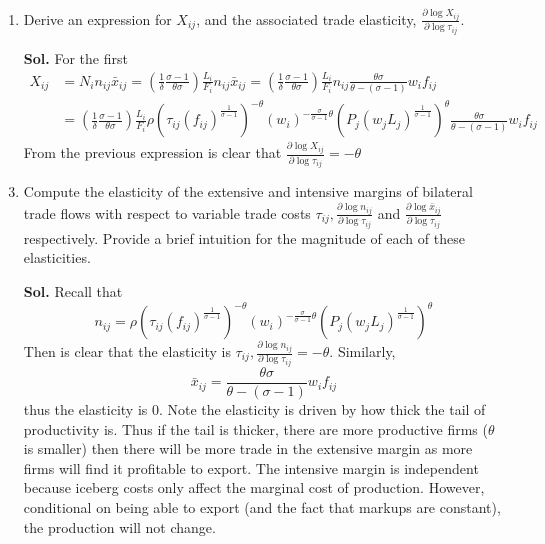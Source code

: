 \documentclass[12pt,oneside,reqno]{amsart}
\begin{document}
\begin{enumerate}[label=\textbf{\roman*.}]
\begin{enumerate}[label=\textbf{(\alph*)}]
    \item  Derive an expression for $X_{i j}$, and the associated trade elasticity, $\frac{\partial \log X_{i j}}{\partial \log \tau_{i j}}$.
    \item[\textbf{Sol.}] For the first 
    \begin{align*}
        X_{ij} &= N_{i} n_{i j} \bar{x}_{i j}  
        = \left(\frac{1}{\delta} \frac{\sigma-1}{\theta \sigma}\right) \frac{L_{i}}{F_{i}} n_{i j} \bar{x}_{i j}
        = \left(\frac{1}{\delta} \frac{\sigma-1}{\theta \sigma}\right) \frac{L_{i}}{F_{i}} n_{i j} \frac{\theta \sigma}{\theta-(\sigma-1)} w_{i} f_{i j} \\ 
        &= \left(\frac{1}{\delta} \frac{\sigma-1}{\theta \sigma}\right) \frac{L_{i}}{F_{i}} \rho\left(\tau_{i j}\left(f_{i j}\right)^{\frac{1}{\sigma-1}}\right)^{-\theta}\left(w_{i}\right)^{-\frac{\sigma}{\sigma-1} \theta}\left(P_{j}\left(w_{j} L_{j}\right)^{\frac{1}{\sigma-1}}\right)^{\theta} \frac{\theta \sigma}{\theta-(\sigma-1)} w_{i} f_{i j}  
    \end{align*}
    From the previous expression is clear that $\frac{\partial \log X_{i j}}{\partial \log \tau_{i j}} = -\theta$
    \item Compute the elasticity of the extensive and intensive margins of bilateral trade flows with respect to variable trade costs $\tau_{i j}, \frac{\partial \log n_{i j}}{\partial \log \tau_{i j}}$ and $\frac{\partial \log \bar{x}_{i j}}{\partial \log \tau_{i j}}$ respectively. Provide a brief intuition for the magnitude of each of these elasticities.
    \item[\textbf{Sol.}] Recall that 
    \begin{equation*}
        n_{i j}=\rho\left(\tau_{i j}\left(f_{i j}\right)^{\frac{1}{\sigma-1}}\right)^{-\theta}\left(w_{i}\right)^{-\frac{\sigma}{\sigma-1} \theta}\left(P_{j}\left(w_{j} L_{j}\right)^{\frac{1}{\sigma-1}}\right)^{\theta}
    \end{equation*}
    Then is clear that the elasticity is $\tau_{i j}, \frac{\partial \log n_{i j}}{\partial \log \tau_{i j}} = -\theta$. Similarly, 
    \begin{equation*}
        \bar{x}_{i j}=\frac{\theta \sigma}{\theta-(\sigma-1)} w_{i} f_{i j}
    \end{equation*}
    thus the elasticity is 0. Note the elasticity is driven by how thick the tail of productivity is. Thus if the tail is thicker, there are more productive firms ($\theta$ is smaller) then there will be more trade in the extensive margin as more firms will find it profitable to export. The intensive margin is independent because iceberg costs only affect the marginal cost of production. However, conditional on being able to export (and the fact that markups are constant), the production will not change. 


\end{enumerate}
\end{enumerate}
\end{document}
